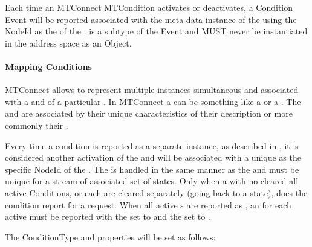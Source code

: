 Each time an MTConnect \gls{MTCondition} activates or deactivates, a \gls{Condition} \gls{Event} will be reported associated with the meta-data instance of the  using the \gls{NodeId} as the  of the .   is a subtype of the \gls{Event} and MUST never be instantiated in the address space as an \gls{Object}.

\paragraph{Mapping Conditions}

MTConnect allows  to represent multiple instances simultaneous  and  associated with a  and of a particular . In MTConnect a  can be something like a  or a . The   and  are associated by their unique characteristics of their description or more commonly their .

Every time a condition is reported as a separate instance, as described in \cite{MTCPart3}, it is considered another activation of the  and will be associated with a unique  as the specific \gls{NodeId} of the . The  is handled in the same manner as the  and must be unique for a stream of associated  set of states. Only when a  with no  cleared all active Conditions, or each are cleared separately (going back to a  state), does the condition report  for a  request. When all active s are reported as , an  for each active  must be reported with the  set to  and the  set to .

The \gls{ConditionType} and  properties will be set as follows:

